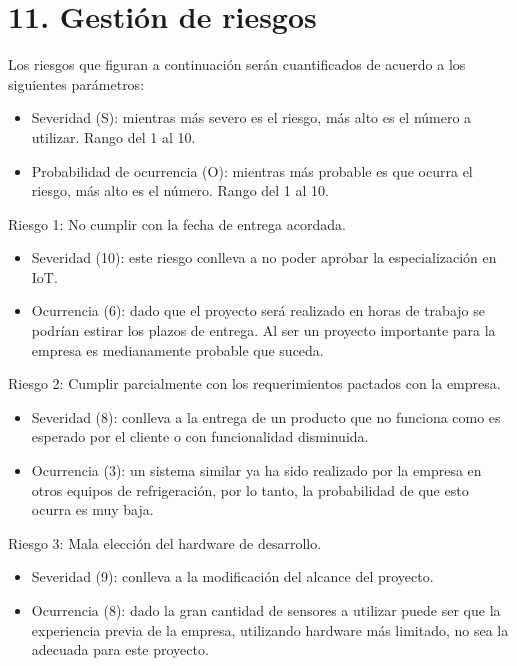 \documentclass[
11pt, %
]{charter}
\begin{document}
\section{11. Gestión de riesgos}
\label{sec:riesgos}

Los riesgos que figuran a continuación serán cuantificados de acuerdo a los siguientes parámetros:
\begin{itemize}
	\item Severidad (S): mientras más severo es el riesgo, más alto es el número a utilizar. Rango del 1 al 10.\\
	\item Probabilidad de ocurrencia (O): mientras más probable es que ocurra el riesgo, más alto es el número. Rango del 1 al 10.\\
\end{itemize}   

Riesgo 1: No cumplir con la fecha de entrega acordada.
\begin{itemize}
	\item Severidad (10): este riesgo conlleva a no poder aprobar la especialización en IoT.\\
	\item Ocurrencia (6): dado que el proyecto será realizado en horas de trabajo se podrían estirar los plazos de entrega. Al ser un proyecto importante para la empresa es medianamente probable que suceda. \\
\end{itemize}   

\pagebreak

Riesgo 2: Cumplir parcialmente con los requerimientos pactados con la empresa.
\begin{itemize}
	\item Severidad (8): conlleva a la entrega de un producto que no funciona como es esperado por el cliente o con funcionalidad disminuida.
	\item Ocurrencia (3): un sistema similar ya ha sido realizado por la empresa en otros equipos de refrigeración, por lo tanto, la probabilidad de que esto ocurra es muy baja.
\end{itemize}

Riesgo 3: Mala elección del hardware de desarrollo.
\begin{itemize}
	\item Severidad (9): conlleva a la modificación del alcance del proyecto. 
	\item Ocurrencia (8): dado la gran cantidad de sensores a utilizar puede ser que la experiencia previa de la empresa, utilizando hardware más limitado, no sea la adecuada para este proyecto.
\end{itemize}
\end{document}

